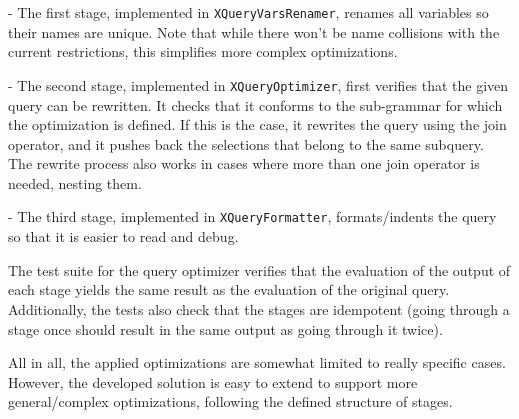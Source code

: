 \documentclass[paper=letter, fontsize=11pt]{scrartcl}
\begin{document}
- The first stage, implemented in \texttt{XQueryVarsRenamer}, renames all variables so their names are unique.
Note that while there won't be name collisions with the current restrictions, this simplifies more complex optimizations.

- The second stage, implemented in \texttt{XQueryOptimizer}, first verifies that the given query can be rewritten.
It checks that it conforms to the sub-grammar for which the optimization is defined.
If this is the case, it rewrites the query using the join operator, and it pushes back the selections that belong to the same subquery.
The rewrite process also works in cases where more than one join operator is needed, nesting them.

- The third stage, implemented in \texttt{XQueryFormatter}, formats/indents the query so that it is easier to read and debug.

The test suite for the query optimizer verifies that the evaluation of the output of each stage yields the same result as the evaluation of the original query.
Additionally, the tests also check that the stages are idempotent (going through a stage once should result in the same output as going through it twice).

All in all, the applied optimizations are somewhat limited to really specific cases.
However, the developed solution is easy to extend to support more general/complex optimizations, following the defined structure of stages.
\end{document}
